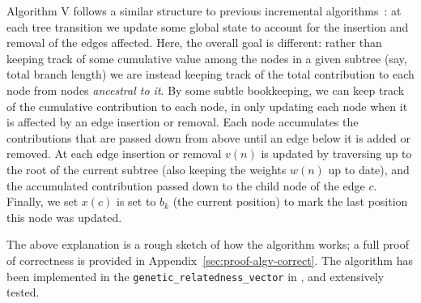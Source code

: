 Algorithm V follows a similar structure to previous incremental 
algorithms~\citep{kelleher2016efficient,ralph2020efficiently}:
at each tree transition we update some global state to account for the 
insertion and removal of the edges affected. Here, the overall 
goal is different: rather than keeping track of some cumulative value
among the nodes in a given subtree (say, total branch length) we are instead
keeping track of the total contribution to each node from nodes
\emph{ancestral to it}.
By some subtle bookkeeping, we can keep track of the cumulative 
contribution to each node, in only updating each node when 
it is affected by an edge insertion or removal.
Each node accumulates the contributions that are passed down from above
until an edge below it is added or removed.
At each edge insertion or removal $v(n)$ is updated by traversing up
to the root of the current subtree (also keeping the weights $w(n)$
up to date), and the accumulated 
contribution passed down to the child node of the edge $c$.
Finally, we set $x(c)$ is set to $b_k$ (the current position) to mark
the last position this node was updated.

The above explanation is a rough sketch of how the algorithm works;
a full proof of correctness is provided in Appendix~\ref{sec:proof-algv-correct}.
The algorithm has been implemented in the \texttt{genetic\_relatedness\_vector}
in \tskit{}, and extensively tested.



